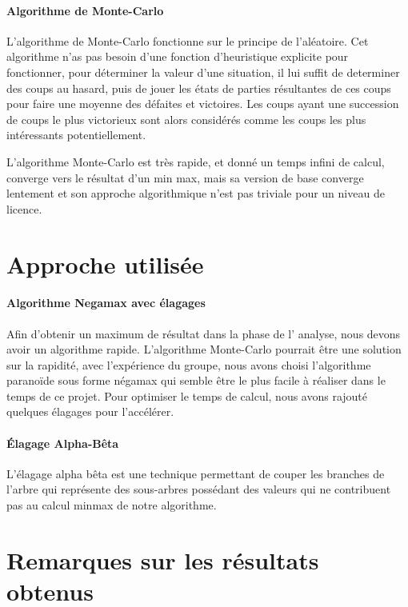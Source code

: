 	\paragraph{Algorithme de Monte-Carlo}
	L'algorithme de Monte-Carlo fonctionne sur le principe de l'aléatoire.
	Cet algorithme n'as pas besoin d'une fonction d'heuristique explicite pour fonctionner, pour déterminer la valeur d'une situation, il lui suffit de determiner des coups au hasard, puis de jouer les états de parties résultantes de ces coups pour faire une moyenne des défaites et victoires. Les coups ayant une succession de coups le plus victorieux sont alors considérés comme les coups les plus intéressants potentiellement.
	
	L'algorithme Monte-Carlo est très rapide, et donné un temps infini de calcul, converge vers le résultat d'un min max, mais sa version de base converge lentement et son approche algorithmique n'est pas triviale pour un niveau de licence.
	
	\section{Approche utilisée}
	\paragraph{Algorithme Negamax avec élagages}
	Afin d'obtenir un maximum de résultat dans la phase de l'    analyse, nous devons avoir un algorithme rapide. L'algorithme Monte-Carlo    pourrait être une solution sur la rapidité, avec l'expérience du groupe,    nous avons choisi l'algorithme paranoïde sous forme négamax qui semble être le plus facile à    réaliser dans le temps de ce projet. Pour optimiser le temps de calcul, nous    avons rajouté quelques élagages pour l'accélérer.
	
	\paragraph{Élagage Alpha-Bêta}
	L'élagage alpha bêta est une technique permettant de couper les    branches de l'arbre qui représente des sous-arbres possédant des valeurs    qui ne contribuent pas au calcul minmax de notre algorithme.
	
	\section{Remarques sur les résultats obtenus}
	
